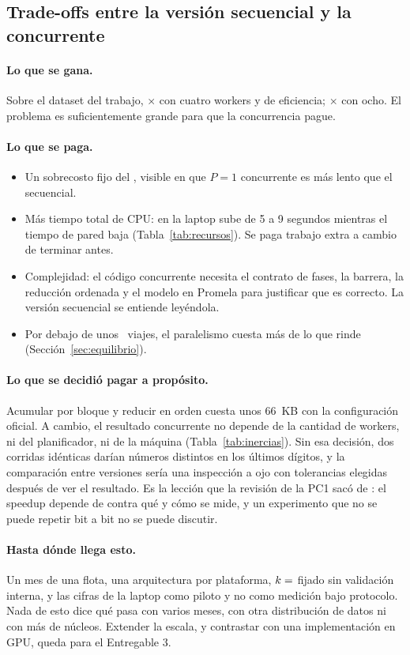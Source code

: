 \subsection{Trade-offs entre la versión secuencial y la concurrente}

\paragraph{Lo que se gana.} Sobre el dataset del trabajo, $\times$ con cuatro
workers y  de eficiencia; $\times$ con ocho. El problema es
suficientemente grande para que la concurrencia pague.

\paragraph{Lo que se paga.}
\begin{itemize}
  \item Un sobrecosto fijo del , visible en que $P = 1$ concurrente es más
        lento que el secuencial.
  \item Más tiempo total de CPU: en la laptop sube de 5 a 9 segundos mientras el tiempo de pared
        baja (Tabla~\ref{tab:recursos}). Se paga trabajo extra a cambio de terminar antes.
  \item Complejidad: el código concurrente necesita el contrato de fases, la barrera, la reducción
        ordenada y el modelo en Promela para justificar que es correcto. La versión secuencial se
        entiende leyéndola.
  \item Por debajo de unos ~viajes, el paralelismo cuesta más de lo que rinde
        (Sección~\ref{sec:equilibrio}).
\end{itemize}

\paragraph{Lo que se decidió pagar a propósito.} Acumular por bloque y reducir en orden cuesta unos
66~KB con la configuración oficial. A cambio, el resultado concurrente no depende de la cantidad de
workers, ni del planificador, ni de la máquina (Tabla~\ref{tab:inercias}). Sin esa decisión, dos
corridas idénticas darían números distintos en los últimos dígitos, y la comparación entre versiones
sería una inspección a ojo con tolerancias elegidas después de ver el resultado. Es la lección que la
revisión de la PC1 sacó de \textcite{bellavita2025}: el speedup depende de contra qué y cómo se mide,
y un experimento que no se puede repetir bit a bit no se puede discutir.

\paragraph{Hasta dónde llega esto.} Un mes de una flota, una arquitectura por plataforma,
$k = \cifra{k}$ fijado sin validación interna, y las cifras de la laptop como piloto y no como
medición bajo protocolo. Nada de esto dice qué pasa con varios meses, con otra distribución de datos
ni con más de  núcleos. Extender la escala, y contrastar con una implementación en
GPU, queda para el Entregable 3.
